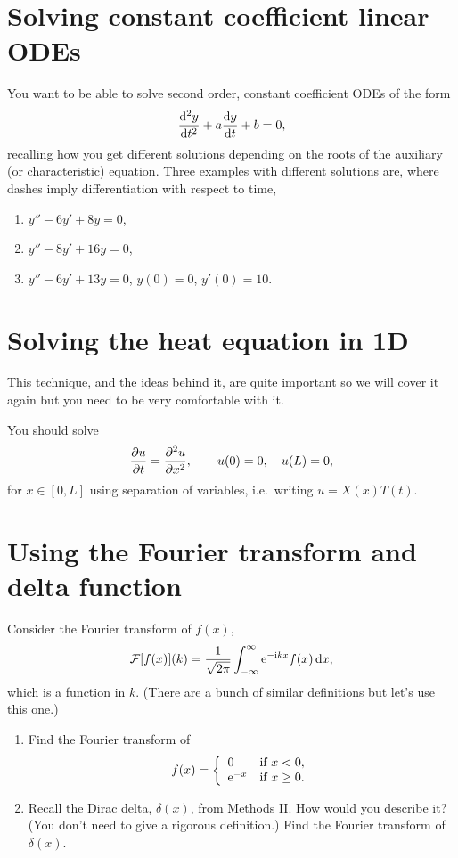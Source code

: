 \documentclass[a4paper,12pt]{article}
\begin{document}
\section{Solving constant coefficient linear ODEs}
You want to be able to solve second order, constant coefficient ODEs of the form
\begin{equation*}
    \fdd{y}{t} + a\fd{y}{t} + b = 0,
\end{equation*}
recalling how you get different solutions depending on the roots of the auxiliary (or characteristic) equation. Three examples with different solutions are, where dashes imply differentiation with respect to time,
\begin{enumerate}[label=(\alph*)]
    \item $y''-6y'+8y=0$,
    \item $y''-8y'+16y=0$,
    \item $y''-6y'+13y=0$, $y(0)=0$, $y'(0)=10$.
\end{enumerate}

\section{Solving the heat equation in 1D}
This technique, and the ideas behind it, are quite important so we will cover it again but you need to be very comfortable with it. 

You should solve
\begin{equation*}
    \pd{u}{t} = \pdd{u}{x}, \qquad u(0)=0, \quad u(L)=0,
\end{equation*}
for $x\in[0,L]$ using separation of variables, i.e.\ writing $u=X(x)T(t)$.

\section{Using the Fourier transform and delta function}
Consider the Fourier transform of $f(x)$,
\begin{equation*}
    \mathcal{F}[f(x)](k) = \frac{1}{\sqrt{2\pi}}\int_{-\infty}^\infty \mathrm{e}^{-\mathrm{i} k x}f(x)\,{\mathrm d} x,
\end{equation*}
which is a function in $k$. (There are a bunch of similar definitions but let's use this one.) 

\begin{enumerate}[label=(\alph*)]
    \item Find the Fourier transform of  
    \begin{equation*}
    f(x) = \left\{ \begin{array}{ll} 0 & \mbox{if } x<0, \\ \mathrm{e}^{-x} & \mbox{if } x\geq0. \end{array} \right.
    \end{equation*}
    \item Recall the Dirac delta, $\delta(x)$, from Methods II. How would you describe it? (You don't need to give a rigorous definition.) Find the Fourier transform of $\delta(x)$.
\end{enumerate}
\end{document}
